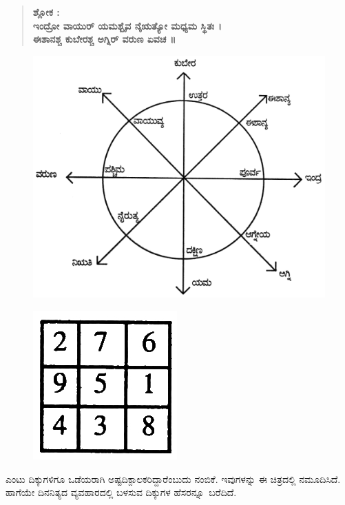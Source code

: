 \begin{quote}
\textbf{ಶ್ಲೋಕ :}\\
\textbf{ಇಂದ್ರೋ ವಾಯುರ್ ಯಮಶ್ಬೈವ ನೈಋತ್ಯೋ ಮಧ್ಯಮ ಸ್ಥಿತಃ ।}\\
\textbf{ಈಶಾನಶ್ಚ ಕುಬೇರಶ್ಚ ಅಗ್ನಿರ್ ವರುಣ ಏವಚ ॥}
\end{quote}
\begin{figure}[H]
\includegraphics[scale=.9]{src/figures/chap3/fig3-38.jpg}
\end{figure}
\begin{figure}[H]
\includegraphics{src/figures/chap3/fig3-39.jpg}
\end{figure}

ಎಂಟು ದಿಕ್ಕುಗಳಿಗೂ ಒಡೆಯರಾಗಿ ಅಷ್ಟದಿಕ್ಪಾಲಕರಿದ್ದಾರೆಂಬುದು ನಂಬಿಕೆ. ಇವುಗಳನ್ನು ಈ ಚಿತ್ರದಲ್ಲಿ ನಮೂದಿಸಿದೆ. ಹಾಗೆಯೇ ದಿನನಿತ್ಯದ ವ್ಯವಹಾರದಲ್ಲಿ ಬಳಸುವ ದಿಕ್ಕುಗಳ \hbox{ಹೆಸರನ್ನೂ ಬರೆದಿದೆ.}


